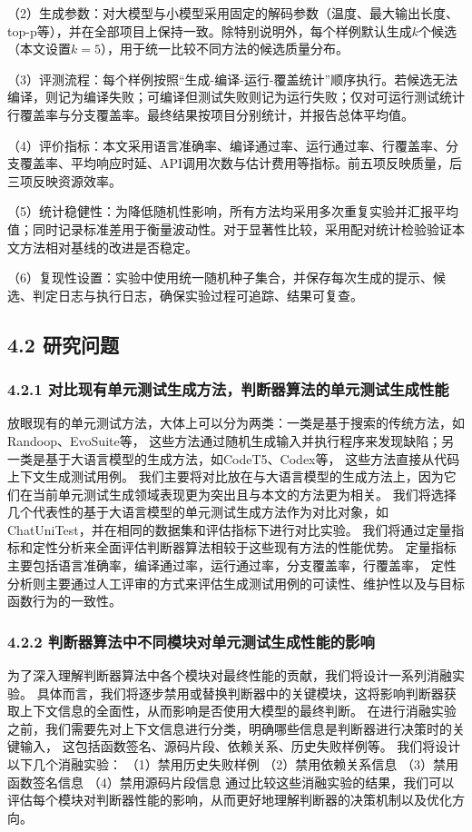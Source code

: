 （2）生成参数：对大模型与小模型采用固定的解码参数（温度、最大输出长度、top-p等），并在全部项目上保持一致。除特别说明外，每个样例默认生成$k$个候选（本文设置$k=5$），用于统一比较不同方法的候选质量分布。

（3）评测流程：每个样例按照“生成-编译-运行-覆盖统计”顺序执行。若候选无法编译，则记为编译失败；可编译但测试失败则记为运行失败；仅对可运行测试统计行覆盖率与分支覆盖率。最终结果按项目分别统计，并报告总体平均值。

（4）评价指标：本文采用语言准确率、编译通过率、运行通过率、行覆盖率、分支覆盖率、平均响应时延、API调用次数与估计费用等指标。前五项反映质量，后三项反映资源效率。

（5）统计稳健性：为降低随机性影响，所有方法均采用多次重复实验并汇报平均值；同时记录标准差用于衡量波动性。对于显著性比较，采用配对统计检验验证本文方法相对基线的改进是否稳定。

（6）复现性设置：实验中使用统一随机种子集合，并保存每次生成的提示、候选、判定日志与执行日志，确保实验过程可追踪、结果可复查。

\subsection{4.2 研究问题}

\subsubsection{4.2.1 对比现有单元测试生成方法，判断器算法的单元测试生成性能}
放眼现有的单元测试方法，大体上可以分为两类：一类是基于搜索的传统方法，如Randoop、EvoSuite等，
这些方法通过随机生成输入并执行程序来发现缺陷；另一类是基于大语言模型的生成方法，如CodeT5、Codex等，
这些方法直接从代码上下文生成测试用例。
我们主要将对比放在与大语言模型的生成方法上，因为它们在当前单元测试生成领域表现更为突出且与本文的方法更为相关。
我们将选择几个代表性的基于大语言模型的单元测试生成方法作为对比对象，如ChatUniTest，并在相同的数据集和评估指标下进行对比实验。
我们将通过定量指标和定性分析来全面评估判断器算法相较于这些现有方法的性能优势。
定量指标主要包括语言准确率，编译通过率，运行通过率，分支覆盖率，行覆盖率，
定性分析则主要通过人工评审的方式来评估生成测试用例的可读性、维护性以及与目标函数行为的一致性。

\subsubsection{4.2.2 判断器算法中不同模块对单元测试生成性能的影响}
为了深入理解判断器算法中各个模块对最终性能的贡献，我们将设计一系列消融实验。
具体而言，我们将逐步禁用或替换判断器中的关键模块，这将影响判断器获取上下文信息的全面性，从而影响是否使用大模型的最终判断。
在进行消融实验之前，我们需要先对上下文信息进行分类，明确哪些信息是判断器进行决策时的关键输入，
这包括函数签名、源码片段、依赖关系、历史失败样例等。
我们将设计以下几个消融实验：
（1）禁用历史失败样例
（2）禁用依赖关系信息
（3）禁用函数签名信息
（4）禁用源码片段信息
通过比较这些消融实验的结果，我们可以评估每个模块对判断器性能的影响，从而更好地理解判断器的决策机制以及优化方向。


